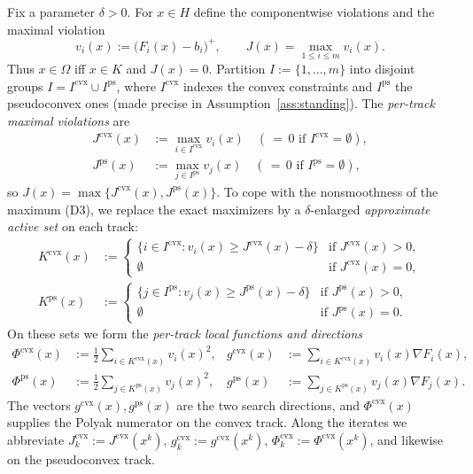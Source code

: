 \documentclass[]{interact}
\theoremstyle{plain}
\theoremstyle{definition}
\theoremstyle{remark}
\newcommand{\cvx}{\mathrm{cvx}}
\newcommand{\ps}{\mathrm{ps}}
\begin{document}
Fix a parameter $\delta>0$. For $x\in H$ define the componentwise violations and the
maximal violation
\begin{equation}\label{eq:vi}
v_i(x):=\bigl(F_i(x)-b_i\bigr)^+,\qquad J(x)=\max_{1\le i\le m}v_i(x).
\end{equation}
Thus $x\in\Omega$ iff $x\in K$ and $J(x)=0$. Partition $I:=\{1,\dots,m\}$ into disjoint
groups $I=I^{\cvx}\cup I^{\ps}$, where $I^{\cvx}$ indexes the convex constraints and
$I^{\ps}$ the pseudoconvex ones (made precise in Assumption~\ref{ass:standing}). The
\emph{per-track maximal violations} are
\begin{align}
J^{\cvx}(x)&:=\max_{i\in I^{\cvx}}v_i(x)\quad(\,{=}\,0\text{ if }I^{\cvx}=\emptyset),\label{eq:Jcvx}\\
J^{\ps}(x)&:=\max_{j\in I^{\ps}}v_j(x)\quad(\,{=}\,0\text{ if }I^{\ps}=\emptyset),\label{eq:Jps}
\end{align}
so $J(x)=\max\{J^{\cvx}(x),J^{\ps}(x)\}$. To cope with the nonsmoothness of the maximum
(D3), we replace the exact maximizers by a $\delta$-enlarged \emph{approximate active
set} on each track:
\begin{align}
K^{\cvx}(x)&:=\begin{cases}\{i\in I^{\cvx}:v_i(x)\ge J^{\cvx}(x)-\delta\} & \text{if }J^{\cvx}(x)>0,\\ \emptyset & \text{if }J^{\cvx}(x)=0,\end{cases}\label{eq:Kcvx}\\[2pt]
K^{\ps}(x)&:=\begin{cases}\{j\in I^{\ps}:v_j(x)\ge J^{\ps}(x)-\delta\} & \text{if }J^{\ps}(x)>0,\\ \emptyset & \text{if }J^{\ps}(x)=0.\end{cases}\label{eq:Kps}
\end{align}
On these sets we form the \emph{per-track local functions and directions}
\begin{align}
\Phi^{\cvx}(x)&:=\tfrac12\!\!\sum_{i\in K^{\cvx}(x)}\!\! v_i(x)^2, & g^{\cvx}(x)&:=\!\!\sum_{i\in K^{\cvx}(x)}\!\! v_i(x)\nabla F_i(x),\label{eq:phi-g-cvx}\\
\Phi^{\ps}(x)&:=\tfrac12\!\!\sum_{j\in K^{\ps}(x)}\!\! v_j(x)^2, & g^{\ps}(x)&:=\!\!\sum_{j\in K^{\ps}(x)}\!\! v_j(x)\nabla F_j(x).\label{eq:phi-g-ps}
\end{align}
The vectors $g^{\cvx}(x),g^{\ps}(x)$ are the two search directions, and $\Phi^{\cvx}(x)$
supplies the Polyak numerator on the convex track. Along the iterates we abbreviate
$J^{\cvx}_k:=J^{\cvx}(x^k)$, $g^{\cvx}_k:=g^{\cvx}(x^k)$, $\Phi^{\cvx}_k:=\Phi^{\cvx}(x^k)$,
and likewise on the pseudoconvex track.
\end{document}
